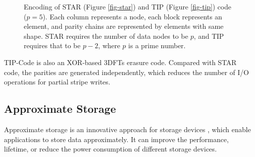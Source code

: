 \documentclass[sigconf]{acmart}
\begin{document}
\begin{figure}[!ht]
\centering
{}
\hspace{5pt}
\vspace{-3mm}
\caption{Encoding of STAR (Figure \ref{fig-star}) and TIP (Figure \ref{fig-tip}) code ($p = 5$). Each column represents a node, each block represents an element, and parity chains are represented by elements with same shape. STAR requires the number of data nodes to be $p$, and TIP requires that to be $p-2$, where $p$ is a prime number.}
\vspace{-3mm}
\label{fig-star-tip}
\end{figure}

TIP-Code is also an XOR-based 3DFTs erasure code.
Compared with STAR code, the parities are generated independently, which reduces the number of I/O operations for partial stripe writes.

\subsection{Approximate Storage}
Approximate storage is an innovative approach for storage devices \cite{zhao2017approximate, sampson2014approximate, guo2016high, jevdjic2017approximate}, which enable applications to store data approximately. It can improve the performance, lifetime, or reduce the power consumption of different storage devices.
\end{document}
